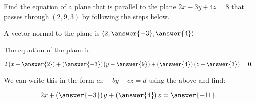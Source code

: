 \documentclass{ximera}
\author{Jim Talamo}
\begin{document}
\begin{exercise}
Find the equation of a plane that is parallel to the plane $2x-3y+4z=8$ that passes through $(2,9,3)$ by following the steps below.

A vector normal to the plane is $\vector{2,\answer{-3},\answer{4}}$

The equation of the plane is 

\[
2\left(x-\answer{2}\right) + \left( \answer{-3} \right)\left(y-\answer{9}\right)+ \left( \answer{4} \right)\left(z-\answer{3}\right) =0.
\]

We can write this in the form $ax+by+cz=d$ using the above and find:

\[
2x+ \left(\answer{-3} \right)y+\left(\answer{4}\right)z= \answer{-11}.
\]


\end{exercise}
\end{document}
